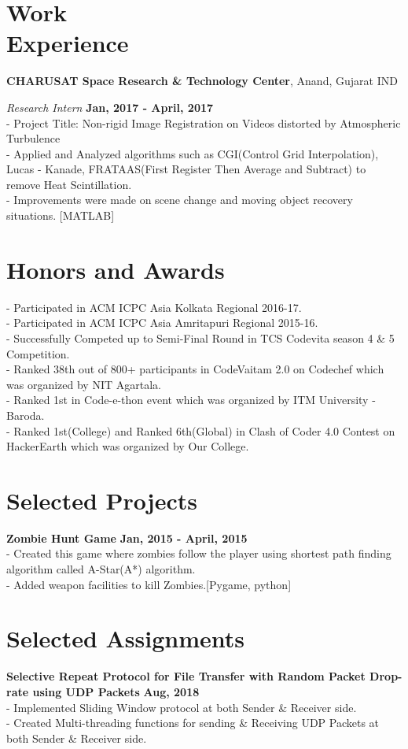 \documentclass[margin,line]{res}
\begin{document}
\begin{resume}
\section{\sc Work \\ Experience}
{\bf CHARUSAT Space Research \& Technology Center}, Anand, Gujarat IND

\vspace{-.3cm}
{\em Research Intern} \hfill {\bf Jan, 2017 - April, 2017}\\
- Project Title: Non-rigid Image Registration on Videos distorted by Atmospheric Turbulence \\
- Applied and Analyzed algorithms such as CGI(Control Grid Interpolation), Lucas - Kanade, FRATAAS(First Register Then Average and Subtract) to remove Heat Scintillation.\\
- Improvements were made on scene change and moving object recovery situations. [MATLAB]

\section{\sc Honors and Awards} 
- Participated in ACM ICPC Asia Kolkata Regional 2016-17.\\
- Participated in ACM ICPC Asia Amritapuri Regional 2015-16. \\
- Successfully Competed up to Semi-Final Round in TCS Codevita season 4 \& 5 Competition.\\
- Ranked 38th out of 800+ participants in CodeVaitam 2.0 on Codechef which was organized by NIT Agartala.\\
- Ranked 1st in Code-e-thon event which was organized by ITM University - Baroda.\\
- Ranked 1st(College) and Ranked 6th(Global) in Clash of Coder 4.0 Contest on HackerEarth which was organized by Our College.

\section{\sc Selected Projects}
{\bf Zombie Hunt Game}
\hfill {\bf Jan, 2015 - April, 2015}\\
- Created this game where zombies follow the player using shortest path finding algorithm called A-Star(A*) algorithm. \\
- Added weapon facilities to kill Zombies.[Pygame, python]

\section{\sc Selected Assignments}
{\bf Selective Repeat Protocol for File Transfer with Random Packet Drop-rate using UDP Packets}
\hfill {\bf Aug, 2018}\\
- Implemented Sliding Window protocol at both Sender \& Receiver side.\\
- Created Multi-threading functions for sending \& Receiving UDP Packets at both Sender \& Receiver side.


\end{resume}
\end{document}
